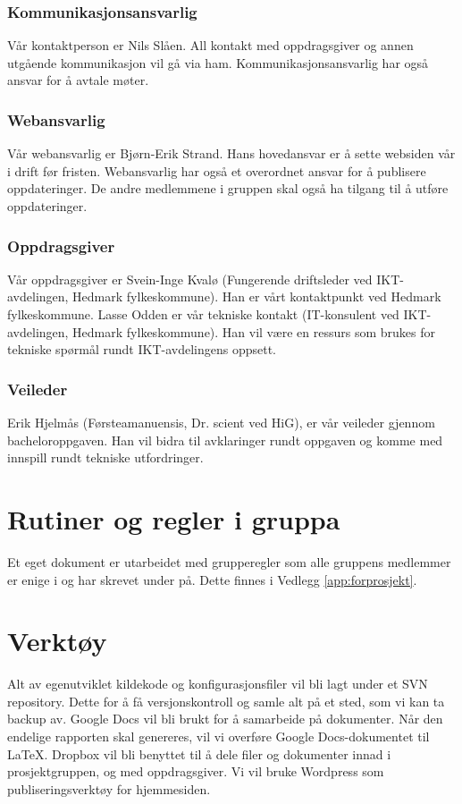 \subsubsection{Kommunikasjonsansvarlig}
Vår kontaktperson er Nils Slåen. All kontakt med oppdragsgiver og annen utgående kommunikasjon vil gå via ham. Kommunikasjonsansvarlig har også ansvar for å avtale møter.

\subsubsection{Webansvarlig}
Vår webansvarlig er Bjørn-Erik Strand. Hans hovedansvar er å sette websiden vår i drift før fristen. Webansvarlig har også et overordnet ansvar for å publisere oppdateringer. De andre medlemmene i gruppen skal også ha tilgang til å utføre oppdateringer.

\subsubsection{Oppdragsgiver}
Vår oppdragsgiver er Svein-Inge Kvalø (Fungerende driftsleder ved IKT-avdelingen, Hedmark fylkeskommune). Han er vårt kontaktpunkt ved Hedmark fylkeskommune. Lasse Odden er vår tekniske kontakt (IT-konsulent ved IKT-avdelingen, Hedmark fylkeskommune). Han vil være en ressurs som brukes for tekniske spørmål rundt IKT-avdelingens oppsett.

\subsubsection{Veileder}
Erik Hjelmås (Førsteamanuensis, Dr. scient ved HiG), er vår veileder gjennom bacheloroppgaven. Han vil bidra til avklaringer rundt oppgaven og komme med innspill rundt tekniske utfordringer.

\section{Rutiner og regler i gruppa}
Et eget dokument er utarbeidet med grupperegler som alle gruppens medlemmer er enige i og har skrevet under på. Dette finnes i Vedlegg \ref{app:forprosjekt}.

\section{Verktøy}
Alt av egenutviklet kildekode og konfigurasjonsfiler vil bli lagt under et SVN repository. Dette for å få versjonskontroll og samle alt på et sted, som vi kan ta backup av. Google Docs vil bli brukt for å samarbeide på dokumenter. Når den endelige rapporten skal genereres, vil vi overføre Google Docs-dokumentet til \LaTeX. Dropbox vil bli benyttet til å dele filer og dokumenter innad i prosjektgruppen, og med oppdragsgiver. Vi vil bruke Wordpress som publiseringsverktøy for hjemmesiden.


